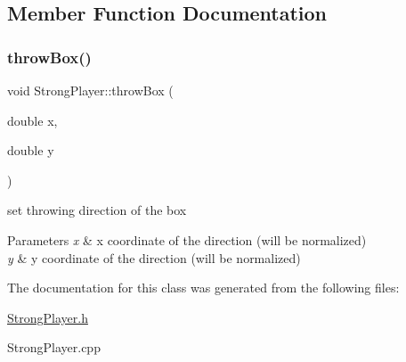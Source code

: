 \subsection{Member Function Documentation}
\mbox{\label{class_strong_player_afb33164ecdb89f91cb32c9b59c6805d1}} 
\subsubsection{\texorpdfstring{throw\+Box()}{throwBox()}}
{\footnotesize\ttfamily void Strong\+Player\+::throw\+Box (\begin{DoxyParamCaption}\item[{double}]{x,  }\item[{double}]{y }\end{DoxyParamCaption})}



set throwing direction of the box 


\begin{DoxyParams}{Parameters}
{\em x} & x coordinate of the direction (will be normalized) \\
\hline
{\em y} & y coordinate of the direction (will be normalized) \\
\hline
\end{DoxyParams}


The documentation for this class was generated from the following files\+:\begin{DoxyCompactItemize}
\item 
\hyperlink{_strong_player_8h}{Strong\+Player.\+h}\item 
Strong\+Player.\+cpp\end{DoxyCompactItemize}
